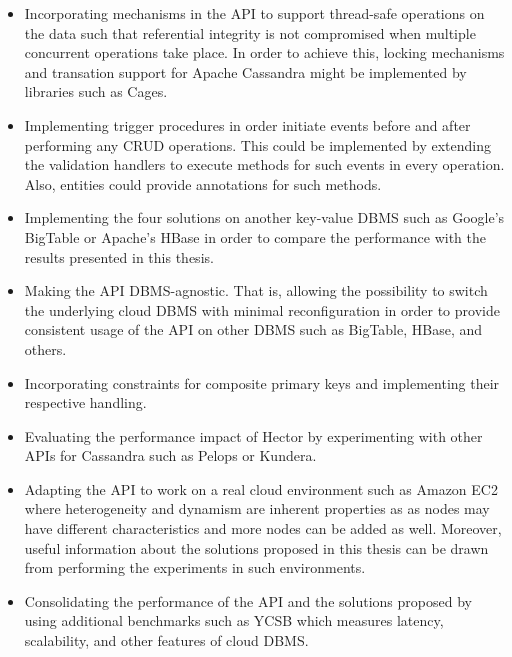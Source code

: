 \begin{itemize}
    \item Incorporating mechanisms in the \ac{API} to support thread-safe operations on the
  data such that referential integrity is not compromised when multiple concurrent operations
  take place. In order to achieve this, locking mechanisms and transation support for Apache
  Cassandra might be implemented by libraries such as Cages.
  
  \item Implementing trigger procedures in order initiate events 
  before and after performing any \ac{CRUD} operations. This could be implemented by 
  extending the validation handlers to execute methods for such events in every operation. 
  Also, entities could provide annotations for such methods.
  
  \item Implementing the four solutions on another key-value \ac{DBMS} such as
  Google's BigTable or Apache's HBase in order to compare the performance with 
  the results presented in this thesis. 
  
  \item Making the \ac{API} \ac{DBMS}-agnostic. That is, allowing the possibility 
  to switch the underlying cloud \ac{DBMS} with minimal reconfiguration in order 
  to provide consistent usage of the \ac{API} on other \ac{DBMS} such as 
  BigTable, HBase, and others.
  
  \item Incorporating constraints for composite primary keys and implementing their 
  respective handling.
  
  
  \item Evaluating the performance impact of Hector by experimenting with 
  other \acp{API} for Cassandra such as Pelops or Kundera.
  
  
  \item Adapting the \ac{API} to work on a real cloud environment such as Amazon
  EC2 where heterogeneity and  dynamism  are inherent properties as 
  as nodes may have different characteristics and more nodes can be added as well.
  Moreover, useful information about the solutions proposed in this thesis 
  can be drawn from performing the experiments in such environments.
  
  \item Consolidating the performance of the \ac{API} and the solutions proposed
  by using additional benchmarks such as \ac{YCSB} which measures latency,
  scalability, and other features of cloud \ac{DBMS}.
 

\end{itemize}
